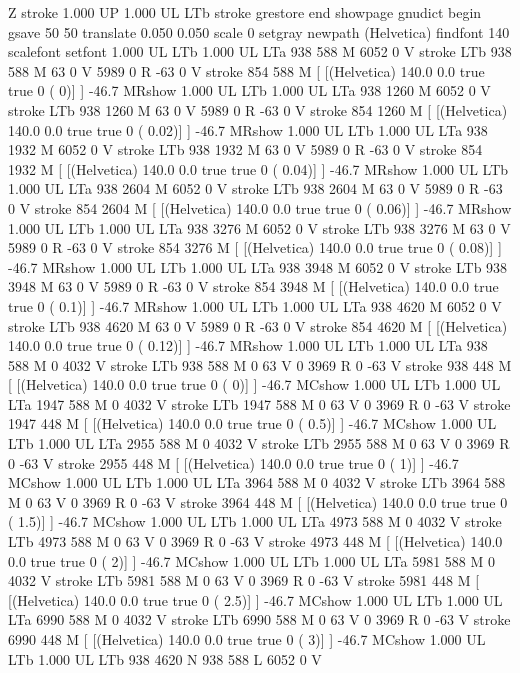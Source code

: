 Z stroke
1.000 UP
1.000 UL
LTb
stroke
grestore
end
showpage
gnudict begin
gsave
50 50 translate
0.050 0.050 scale
0 setgray
newpath
(Helvetica) findfont 140 scalefont setfont
1.000 UL
LTb
1.000 UL
LTa
938 588 M
6052 0 V
stroke
LTb
938 588 M
63 0 V
5989 0 R
-63 0 V
stroke
854 588 M
[ [(Helvetica) 140.0 0.0 true true 0 ( 0)]
] -46.7 MRshow
1.000 UL
LTb
1.000 UL
LTa
938 1260 M
6052 0 V
stroke
LTb
938 1260 M
63 0 V
5989 0 R
-63 0 V
stroke
854 1260 M
[ [(Helvetica) 140.0 0.0 true true 0 ( 0.02)]
] -46.7 MRshow
1.000 UL
LTb
1.000 UL
LTa
938 1932 M
6052 0 V
stroke
LTb
938 1932 M
63 0 V
5989 0 R
-63 0 V
stroke
854 1932 M
[ [(Helvetica) 140.0 0.0 true true 0 ( 0.04)]
] -46.7 MRshow
1.000 UL
LTb
1.000 UL
LTa
938 2604 M
6052 0 V
stroke
LTb
938 2604 M
63 0 V
5989 0 R
-63 0 V
stroke
854 2604 M
[ [(Helvetica) 140.0 0.0 true true 0 ( 0.06)]
] -46.7 MRshow
1.000 UL
LTb
1.000 UL
LTa
938 3276 M
6052 0 V
stroke
LTb
938 3276 M
63 0 V
5989 0 R
-63 0 V
stroke
854 3276 M
[ [(Helvetica) 140.0 0.0 true true 0 ( 0.08)]
] -46.7 MRshow
1.000 UL
LTb
1.000 UL
LTa
938 3948 M
6052 0 V
stroke
LTb
938 3948 M
63 0 V
5989 0 R
-63 0 V
stroke
854 3948 M
[ [(Helvetica) 140.0 0.0 true true 0 ( 0.1)]
] -46.7 MRshow
1.000 UL
LTb
1.000 UL
LTa
938 4620 M
6052 0 V
stroke
LTb
938 4620 M
63 0 V
5989 0 R
-63 0 V
stroke
854 4620 M
[ [(Helvetica) 140.0 0.0 true true 0 ( 0.12)]
] -46.7 MRshow
1.000 UL
LTb
1.000 UL
LTa
938 588 M
0 4032 V
stroke
LTb
938 588 M
0 63 V
0 3969 R
0 -63 V
stroke
938 448 M
[ [(Helvetica) 140.0 0.0 true true 0 ( 0)]
] -46.7 MCshow
1.000 UL
LTb
1.000 UL
LTa
1947 588 M
0 4032 V
stroke
LTb
1947 588 M
0 63 V
0 3969 R
0 -63 V
stroke
1947 448 M
[ [(Helvetica) 140.0 0.0 true true 0 ( 0.5)]
] -46.7 MCshow
1.000 UL
LTb
1.000 UL
LTa
2955 588 M
0 4032 V
stroke
LTb
2955 588 M
0 63 V
0 3969 R
0 -63 V
stroke
2955 448 M
[ [(Helvetica) 140.0 0.0 true true 0 ( 1)]
] -46.7 MCshow
1.000 UL
LTb
1.000 UL
LTa
3964 588 M
0 4032 V
stroke
LTb
3964 588 M
0 63 V
0 3969 R
0 -63 V
stroke
3964 448 M
[ [(Helvetica) 140.0 0.0 true true 0 ( 1.5)]
] -46.7 MCshow
1.000 UL
LTb
1.000 UL
LTa
4973 588 M
0 4032 V
stroke
LTb
4973 588 M
0 63 V
0 3969 R
0 -63 V
stroke
4973 448 M
[ [(Helvetica) 140.0 0.0 true true 0 ( 2)]
] -46.7 MCshow
1.000 UL
LTb
1.000 UL
LTa
5981 588 M
0 4032 V
stroke
LTb
5981 588 M
0 63 V
0 3969 R
0 -63 V
stroke
5981 448 M
[ [(Helvetica) 140.0 0.0 true true 0 ( 2.5)]
] -46.7 MCshow
1.000 UL
LTb
1.000 UL
LTa
6990 588 M
0 4032 V
stroke
LTb
6990 588 M
0 63 V
0 3969 R
0 -63 V
stroke
6990 448 M
[ [(Helvetica) 140.0 0.0 true true 0 ( 3)]
] -46.7 MCshow
1.000 UL
LTb
1.000 UL
LTb
938 4620 N
938 588 L
6052 0 V
